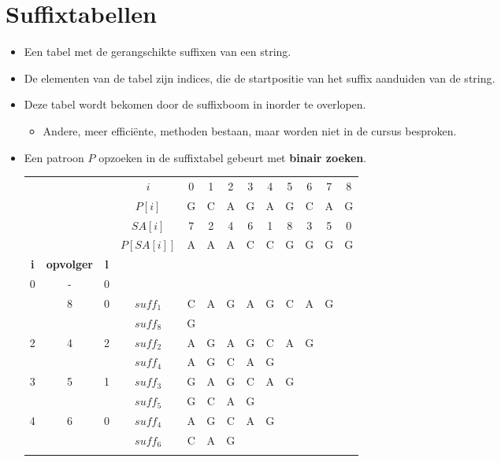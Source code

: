 \section{Suffixtabellen}
\begin{itemize}
    \item Een tabel met de gerangschikte suffixen van een string.
    \item De elementen van de tabel zijn indices, die de startpositie van het suffix aanduiden van de string.
    \item Deze tabel wordt bekomen door de suffixboom in inorder te overlopen. 
    \begin{itemize}
        \item Andere, meer efficiënte, methoden bestaan, maar worden niet in de cursus besproken.
    \end{itemize}

    \item Een patroon $P$ opzoeken in de suffixtabel gebeurt met \textbf{binair zoeken}.
    
    \begin{table}
        \begin{tabular}{|cccc|ccccccccc|}
            \hline
            &&&$i$&0&1&2&3&4&5&6&7&8\\
            &&&$P[i]$&G&C&A&G&A&G&C&A&G\\
            \hline
            &&&$SA[i]$&7&2&4&6&1&8&3&5&0\\
            &&&$P[SA[i]]$&A&A&A&C&C&G&G&G&G\\
            \hline
            \textbf{i}&\textbf{opvolger}&\textbf{l}&&&&&&&&&&\\
            \hdashline
    
            0&-&0&&&&&&&&&&\\
            \hdashline
            1&8&0&$suff_1$&C&A&G&A&G&C&A&G&\\
             & & &$suff_8$&G&&&&&&&& \\
             \hdashline
    
            2&4&2&$suff_2$&A&G&A&G&C&A&G&&\\
            & & &$suff_4$&A&G&C&A&G&&&& \\
            \hdashline
    
            3&5&1&$suff_3$&G&A&G&C&A&G&&&  \\
             & & &$suff_5$&G&C&A&G&&&&& \\
             \hdashline
    
            4&6&0&$suff_4$&A&G&C&A&G&&&&  \\
             & & &$suff_6$&C&A&G&&&&&&\\
             \hdashline
    

\end{tabular}
\end{table}
\end{itemize}

